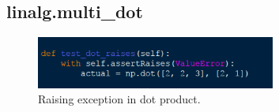 \documentclass[a4paper,11pt]{article}
\begin{document}



\subsection{linalg.multi\_dot}	
\begin{figure}[h]
	\centering
	\includegraphics[width=0.70\textwidth]{snippets/raises.png}
	\caption{Raising exception in dot product.}
	\label{fig:rai}
\end{figure}

\newpage	
\end{document}

